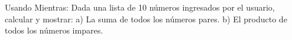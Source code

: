 ﻿
Usando Mientras: Dada una lista de 10 números ingresados por el usuario, calcular y mostrar: a) La suma de todos los números pares. b) El producto de todos los números impares.


\newpage
{}

\volverindice
\newpage
